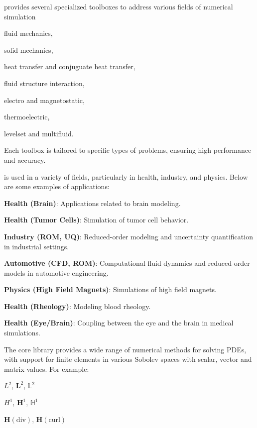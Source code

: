 \Feelpp provides several specialized toolboxes to address various fields of numerical simulation
\begin{inparaenum}[(i)]
        \item fluid mechanics,
        \item solid mechanics,
        \item heat transfer and conjuguate heat transfer,
        \item fluid structure interaction,
        \item electro and magnetostatic,
        \item thermoelectric,
        \item levelset and multifluid.
\end{inparaenum}
Each toolbox is tailored to specific types of problems, ensuring high performance and accuracy.

\Feelpp is used in a variety of fields, particularly in health, industry, and physics. Below are some examples of applications:
\begin{inparaenum}[(i)]
    \item \textbf{Health (Brain)}: Applications related to brain modeling.
    \item \textbf{Health (Tumor Cells)}: Simulation of tumor cell behavior.
    \item \textbf{Industry (ROM, UQ)}: Reduced-order modeling and uncertainty quantification in industrial settings.
    \item \textbf{Automotive (CFD, ROM)}: Computational fluid dynamics and reduced-order models in automotive engineering.
    \item \textbf{Physics (High Field Magnets)}: Simulations of high field magnets.
    \item \textbf{Health (Rheology)}: Modeling blood rheology.
    \item \textbf{Health (Eye/Brain)}: Coupling between the eye and the brain in medical simulations.
\end{inparaenum}

The \Feelpp core library provides a wide range of numerical methods for solving PDEs, with support for finite elements in various Sobolev spaces with scalar, vector and matrix values. For example:
\begin{inparaenum}[(i)]
    \item \( L^2 \), \( \mathbf{L}^2 \), \( \mathbb{L}^2 \)
    \item \( H^1 \), \( \mathbf{H}^1 \), \( \mathbb{H}^1 \)
    \item \( \mathbf{H}(\text{div}) \), \( \mathbf{H}(\text{curl}) \)
\end{inparaenum}

